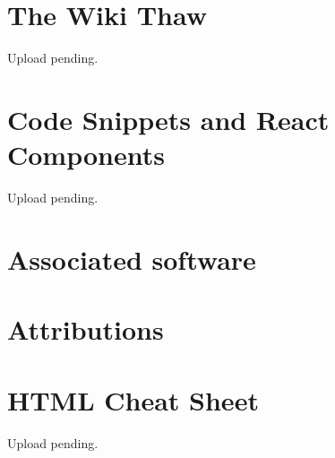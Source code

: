 \documentclass[a4paper, 11pt, twoside]{book}
\begin{document}
\chapter{The Wiki Thaw} \label{ch:thaw}
Upload pending.
%
\newpage
%
\chapter{Code Snippets and React Components} \label{ch:appendix}
Upload pending.
%
\newpage

\backmatter
{}
\pagecolor{pgcolor}

\chapter{Associated software} \label{ch:associated-software}


\chapter{Attributions} \label{ch:attributions}

%
\chapter{HTML Cheat Sheet} \label{ch:htmlcheatsheet}
Upload pending.
%
\newpage
\end{document}
